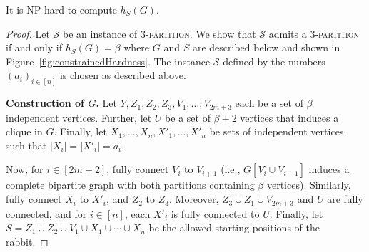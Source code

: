 \documentclass[runningheads]{llncs}
\newcommand{\wal}[1]{\textcolor{red}{#1}}
\begin{document}
\begin{proposition}\label{P:hard}
It is  NP-hard to compute $h_S(G)$.
\end{proposition}
\begin{proof}
Let $\mathcal{S}$ be an instance of \textsc{3-partition}. We show that   $\mathcal{S}$ admits a \textsc{3-partition} if and only if $h_S(G) = \beta$ where $G$ and $S$ are described below and shown in Figure~\ref{fig:constrainedHardness}. The instance $\mathcal{S}$ defined by the numbers $(a_i)_{i \in [n]}$ is chosen as described above. 

\smallskip
\noindent\textbf{Construction of $G$.} Let $Y,Z_1,Z_2, Z_3,V_1,\ldots,V_{2m+3}$ each be a set of $\beta$ independent vertices. Further, let $U$ be a set of $\beta+2$ vertices that induces a clique in $G$. Finally, let $X_1,\ldots,X_n,X'_1,\ldots,X'_n$ be sets of independent vertices such that $|X_i|=|X'_i|=a_i$. %


Now, for $i\in [2m+2]$, fully connect $V_i$ to $V_{i+1}$ (i.e., $G[V_i\cup V_{i+1}]$ induces a complete bipartite graph with both partitions containing $\beta$ vertices). Similarly, fully connect $X_i$ to $X'_i$, and $Z_2$ to $Z_3$. Moreover, $Z_3 \cup Z_1 \cup V_{2m+3}$ and $U$ are fully connected, and for $i\in [n]$, each $X'_i$ is fully connected to $U$. Finally, let $S = Z_1\cup Z_2\cup V_1 \cup X_1 \cup \cdots \cup X_n$ be the allowed starting positions of the rabbit. %



\end{proof}
\end{document}

